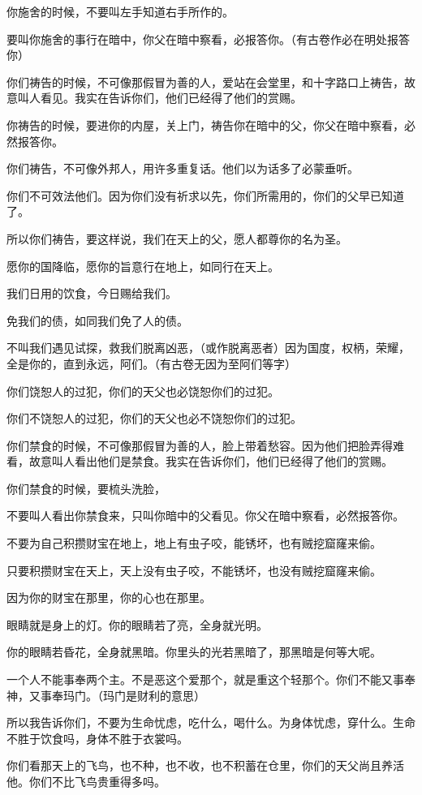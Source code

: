 \documentclass[12pt,oneside]{book}
\begin{document}
你施舍的时候，不要叫左手知道右手所作的。

要叫你施舍的事行在暗中，你父在暗中察看，必报答你。（有古卷作必在明处报答你）

你们祷告的时候，不可像那假冒为善的人，爱站在会堂里，和十字路口上祷告，故意叫人看见。我实在告诉你们，他们已经得了他们的赏赐。

你祷告的时候，要进你的内屋，关上门，祷告你在暗中的父，你父在暗中察看，必然报答你。

你们祷告，不可像外邦人，用许多重复话。他们以为话多了必蒙垂听。

你们不可效法他们。因为你们没有祈求以先，你们所需用的，你们的父早已知道了。

所以你们祷告，要这样说，我们在天上的父，愿人都尊你的名为圣。

愿你的国降临，愿你的旨意行在地上，如同行在天上。

我们日用的饮食，今日赐给我们。

免我们的债，如同我们免了人的债。

不叫我们遇见试探，救我们脱离凶恶，（或作脱离恶者）因为国度，权柄，荣耀，全是你的，直到永远，阿们。（有古卷无因为至阿们等字）

你们饶恕人的过犯，你们的天父也必饶恕你们的过犯。

你们不饶恕人的过犯，你们的天父也必不饶恕你们的过犯。

你们禁食的时候，不可像那假冒为善的人，脸上带着愁容。因为他们把脸弄得难看，故意叫人看出他们是禁食。我实在告诉你们，他们已经得了他们的赏赐。

你们禁食的时候，要梳头洗脸，

不要叫人看出你禁食来，只叫你暗中的父看见。你父在暗中察看，必然报答你。

不要为自己积攒财宝在地上，地上有虫子咬，能锈坏，也有贼挖窟窿来偷。

只要积攒财宝在天上，天上没有虫子咬，不能锈坏，也没有贼挖窟窿来偷。

因为你的财宝在那里，你的心也在那里。

眼睛就是身上的灯。你的眼睛若了亮，全身就光明。

你的眼睛若昏花，全身就黑暗。你里头的光若黑暗了，那黑暗是何等大呢。

一个人不能事奉两个主。不是恶这个爱那个，就是重这个轻那个。你们不能又事奉神，又事奉玛门。（玛门是财利的意思）

所以我告诉你们，不要为生命忧虑，吃什么，喝什么。为身体忧虑，穿什么。生命不胜于饮食吗，身体不胜于衣裳吗。

你们看那天上的飞鸟，也不种，也不收，也不积蓄在仓里，你们的天父尚且养活他。你们不比飞鸟贵重得多吗。
\end{document}
